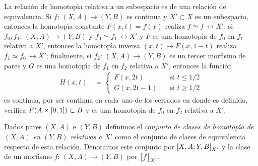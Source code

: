 \begin{obsHomotopiaEsEquivalencia}\label{obs:homotopiaesequivalencia}
	La relaci\'{o}n de homotop\'{\i}a relativa a un subespacio es de una
	relaci\'{o}n de equivalencia. Si $f:\,(X,A)\rightarrow (Y,B)$ es
	continua y $X'\subset X$ es un subespacio, entonces la homotop\'{\i}a
	constante $F(x,t)=f(x)$ realiza $f\simeq f\,\rel{X'}$; si
	$f_{0},f_{1}:\,(X,A)\rightarrow (Y,B)$ y $f_{0}\simeq f_{1}\,\rel{X'}$
	y $F$ es una homotop\'{\i}a de $f_{0}$ en $f_{1}$ relativa a $X'$,
	entonces la homotop\'{\i}a inversa $(x,t)\mapsto F(x,1-t)$ realiza
	$f_{1}\simeq f_{0}\,\rel{X'}$; finalmente, si
	$f_{2}:\,(X,A)\rightarrow (Y,B)$ es un tercer morfismo de pares y
	$G$ es una homotop\'{\i}a de $f_{1}$ en $f_{2}$ relativa a $X'$,
	entonces la funci\'{o}n
	\begin{align*}
		H(x,t) & \,=\,
			\begin{cases}
				F(x,2t) & \quad\text{si }t\leq 1/2 \\
				G(x,2t-1) & \quad\text{si }t\geq 1/2
			\end{cases}
	\end{align*}
	es continua, por ser continua en cada uno de los cerrados en donde
	es definida, verifica $F(A\times\intervalo)\subset B$ y es una
	homotop\'{\i}a de $f_{0}$ en $f_{2}$ relativa a $X'$.

	Dados pares  $(X,A)$ e $(Y,B)$ definimos el \emph{conjunto de clases %
	de homotop\'{\i}a de $(X,A)$ en $(Y,B)$ relativas a $X'$} como el
	conjunto de clases de equivalencia respecto de esta relaci\'{o}n.
	Denotamos este conjunto por $\homotopicas[X']{X,A}{Y,B}$ y la clase
	de un morfismo $f:\,(X,A)\rightarrow (Y,B)$ por $\clase[X']{f}$.
\end{obsHomotopiaEsEquivalencia}

